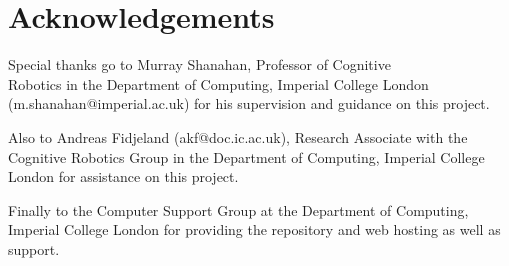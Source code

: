 \documentclass{acm_proc_article-sp}
\begin{document}
\section{Acknowledgements}
{
Special thanks go to Murray Shanahan, Professor of Cognitive \\Robotics in the Department of Computing, Imperial College London \\(m.shanahan@imperial.ac.uk) for his supervision and guidance on this project.

Also to Andreas Fidjeland (akf@doc.ic.ac.uk), Research Associate with the Cognitive Robotics Group in the Department of Computing, Imperial College London for assistance on this project.

Finally to the Computer Support Group\cite{ack:csg} at the Department of Computing, Imperial College London for providing the repository and web hosting as well as support.
}
\newpage 
\end{document}
